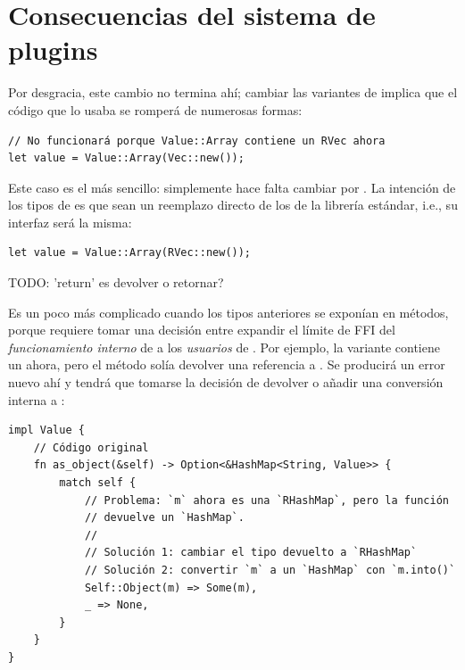 \section{Consecuencias del sistema de plugins}

Por desgracia, este cambio no termina ahí; cambiar las variantes de 
implica que el código que lo usaba se romperá de numerosas formas:

\begin{verbatim}
// No funcionará porque Value::Array contiene un RVec ahora
let value = Value::Array(Vec::new());
\end{verbatim}

Este caso es el más sencillo: simplemente hace falta cambiar  por
. La intención de los tipos de \abistable es que sean un reemplazo
directo de los de la librería estándar, i.e., su interfaz será la misma:

\begin{verbatim}
let value = Value::Array(RVec::new());
\end{verbatim}

TODO: 'return' es devolver o retornar?

Es un poco más complicado cuando los tipos anteriores se exponían en métodos,
porque requiere tomar una decisión entre expandir el límite de FFI del
\emph{funcionamiento interno} de  a los \emph{usuarios} de
. Por ejemplo, la variante  contiene un
 ahora, pero el método  solía devolver una
referencia a . Se producirá un error nuevo ahí y tendrá que
tomarse la decisión de devolver  o añadir una conversión interna
a :

\begin{verbatim}
impl Value {
    // Código original
    fn as_object(&self) -> Option<&HashMap<String, Value>> {
        match self {
            // Problema: `m` ahora es una `RHashMap`, pero la función
            // devuelve un `HashMap`.
            //
            // Solución 1: cambiar el tipo devuelto a `RHashMap`
            // Solución 2: convertir `m` a un `HashMap` con `m.into()`
            Self::Object(m) => Some(m),
            _ => None,
        }
    }
}
\end{verbatim}

